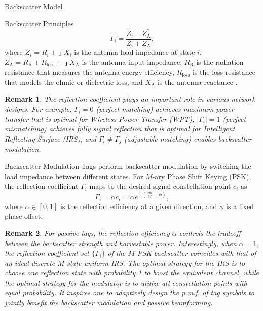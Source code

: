 \documentclass[journal]{IEEEtran}
\newtheorem{remark}{Remark}
\begin{document}
\begin{section}{Backscatter Model}
\begin{subsection}{Backscatter Principles}
			\begin{equation}
				\Gamma_i = \frac{Z_i - Z_{\mathrm{A}}^*}{Z_i + Z_{\mathrm{A}}},
				\label{eq:reflection_coefficient}
			\end{equation}
			where $Z_i = R_i + \jmath X_i$ is the antenna load impedance at state $i$, $Z_{\mathrm{A}} = R_{\mathrm{R}} + R_{\mathrm{loss}} + \jmath X_{\mathrm{A}}$ is the antenna input impedance, $R_{\mathrm{R}}$ is the radiation resistance that measures the antenna energy efficiency, $R_{\mathrm{loss}}$ is the loss resistance that models the ohmic or dielectric loss, and $X_{\mathrm{A}}$ is the antenna reactance \cite{Huang2021}.
			\begin{remark}
				The reflection coefficient plays an important role in various network designs. For example, $\Gamma_i = 0$ (perfect matching) achieves maximum power transfer that is optimal for Wireless Power Transfer (WPT), $\lvert \Gamma_i \rvert = 1$ (perfect mismatching) achieves fully signal reflection that is optimal for Intelligent Reflecting Surface (IRS), and $\Gamma_i \ne \Gamma_j$ (adjustable matching) enables backscatter modulation.
			\end{remark}
		\end{subsection}

		\begin{subsection}{Backscatter Modulation}
			Tags perform backscatter modulation by switching the load impedance between different states. For $M$-ary Phase Shift Keying (PSK), the reflection coefficient $\Gamma_i$ maps to the desired signal constellation point $c_i$ as \cite{Thomas2012a}
			\begin{equation}
				\Gamma_i = \alpha c_i = \alpha e^{\jmath \left(\frac{2 \pi i}{M} + \phi\right)},
				\label{eq:backscatter_modulation}
			\end{equation}
			where $\alpha \in [0,1]$ is the reflection efficiency at a given direction, and $\phi$ is a fixed phase offset.
			\begin{remark}
				For passive tags, the reflection efficiency $\alpha$ controls the tradeoff between the backscatter strength and harvestable power. Interestingly, when $\alpha = 1$, the reflection coefficient set $\{\Gamma_i\}$ of the $M$-PSK backscatter coincides with that of an ideal discrete $M$-state uniform IRS. The optimal strategy for the IRS is to choose one reflection state with probability \num{1} to boost the equivalent channel, while the optimal strategy for the modulator is to utilize all constellation points with equal probability. It inspires one to adaptively design the p.m.f. of tag symbols to jointly benefit the backscatter modulation and passive beamforming.
			\end{remark}
		\end{subsection}
	\end{section}

	
	
\end{document}
